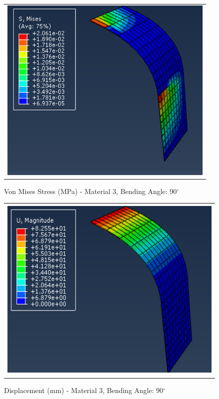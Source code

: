 \documentclass[a4paper,12pt]{article}
\numberwithin{equation}{section}
\numberwithin{figure}{section}
\begin{document}
\begin{figure}[H]
  \centering
  \begin{tabular}{@{}c@{}}
    \includegraphics[width=0.7\linewidth,height=255pt]{Results/Bending/M3_VMS_90.png} \\
  \end{tabular}
  \caption{Von Mises Stress (MPa) - Material 3,  Bending Angle: 90$^{\circ}$ }
\end{figure}

\begin{figure}[H]
  \centering
  \begin{tabular}{@{}c@{}}
    \includegraphics[width=0.7\linewidth,height=255pt]{Results/Bending/M3_DIS_90.png} \\
  \end{tabular}
  \caption{Displacement (mm) - Material 3, Bending Angle: 90$^{\circ}$ }
\end{figure}
\end{document}
